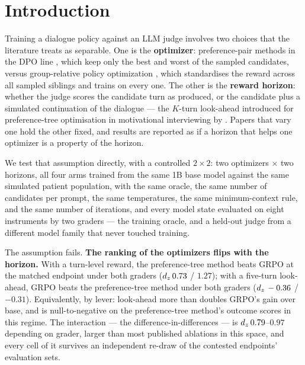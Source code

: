 \section{Introduction}
\label{sec:intro}

Training a dialogue policy against an LLM judge involves two choices that the literature treats
as separable. One is the \textbf{optimizer}: preference-pair methods in the DPO line
\citep{rafailov2023dpo}, which keep only the best and worst of the sampled candidates, versus
group-relative policy optimization \citep{shao2024deepseekmath}, which standardises the reward
across all sampled siblings and trains on every one. The other is the \textbf{reward horizon}:
whether the judge scores the candidate turn as produced, or the candidate plus a simulated
continuation of the dialogue --- the $K$-turn look-ahead introduced for preference-tree
optimisation in motivational interviewing by \citet{baruch2025pto}. Papers that vary one hold
the other fixed, and results are reported as if a horizon that helps one optimizer is a property
of the horizon.

We test that assumption directly, with a controlled $2 \times 2$: two optimizers $\times$ two
horizons, all four arms trained from the same 1B base model against the same simulated patient
population, with the same oracle, the same number of candidates per prompt, the same
temperatures, the same minimum-context rule, and the same number of iterations, and every model
state evaluated on eight instruments by two graders --- the training oracle, and a held-out judge
from a different model family that never touched training.

The assumption fails. \textbf{The ranking of the optimizers flips with the horizon.} With a
turn-level reward, the preference-tree method beats GRPO at the matched endpoint under both
graders ($d_z\,0.73$ / $1.27$); with a five-turn look-ahead, GRPO beats the preference-tree
method under both graders ($d_z\,-0.36$ / $-0.31$). Equivalently, by lever: look-ahead more than
doubles GRPO's gain over base, and is null-to-negative on the preference-tree method's outcome
scores in this regime. The interaction --- the difference-in-differences --- is
$d_z\,0.79$--$0.97$ depending on grader, larger than most published ablations in this space, and
every cell of it survives an independent re-draw of the contested endpoints' evaluation sets.

